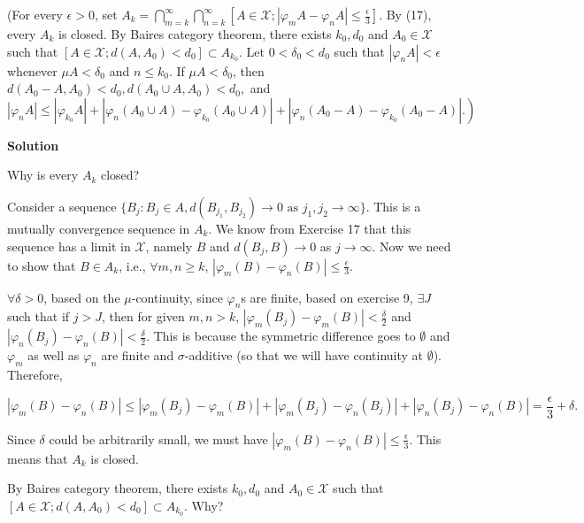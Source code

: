 \documentclass[
]{article}
\begin{document}
(For every \(\epsilon>0\), set
\(A_k=\bigcap_{m=k}^{\infty} \bigcap_{n=k}^{\infty}\left[A \in \mathcal X ;\left|\varphi_m A-\varphi_n A\right|\right.\left.\le \frac{\epsilon}{3}\right]\).
By (17), every \(A_k\) is closed. By Baire\textquotesingle s category
theorem, there exists \(k_0, d_0\) and \(A_0 \in \mathcal X\) such that
\(\left[A \in \mathcal X ; d\left(A, A_0\right)<d_0\right] \subset A_{k_0}\).
Let \(0<\delta_0<d_0\) such that \(\left|\varphi_n A\right|<\epsilon\)
whenever \(\mu A<\delta_0\) and \(n \le k_0\). If \(\mu A<\delta_0\),
then
\(d\left(A_0-A, A_0\right)<d_0,  d\left(A_0 \cup A, A_0\right)<d_0,\)
and
\(\left|\varphi_n A\right| \le\left|\varphi_{k_0} A\right|+\left.\left|\varphi_n\left(A_0 \cup A\right)-\varphi_{k_0}\left(A_0 \cup A\right)\right|+\left|\varphi_n\left(A_0-A\right)-\varphi_{k_0}\left(A_0-A\right)\right|.\right)\)

\textbf{Solution}

Why is every \(A_k\) closed?

Consider a sequence
\(\{B_{j}: B_j\in A, d(B_{j_1}, B_{j_2}) \to 0 \text{ as } j_1, j_2 \to \infty\}\).
This is a mutually convergence sequence in \(A_k\). We know from
Exercise 17 that this sequence has a limit in \(\mathcal X\), namely
\(B\) and \(d(B_j, B) \to 0\) as \(j \to \infty\). Now we need to show
that \(B\in A_k\), i.e., \(\forall m, n \ge k\),
\(|\varphi_m(B) - \varphi_n(B)| \le \frac{\epsilon}{3}\).

\(\forall \delta > 0\), based on the \(\mu\)-continuity, since
\(\varphi_n\)\textquotesingle s are finite, based on exercise 9,
\(\exists J\) such that if \(j > J\), then for given \(m, n > k\),
\(|\varphi_m(B_j) - \varphi_m(B)| < \frac{\delta}{2}\) and
\(|\varphi_n(B_j) - \varphi_n(B)|  < \frac{\delta}{2}\). This is because
the symmetric difference goes to \(\emptyset\) and \(\varphi_m\) as well
as \(\varphi_n\) are finite and \(\sigma\)-additive (so that we will
have continuity at \(\emptyset\)). Therefore,

\[|\varphi_m(B) - \varphi_n(B)| \le |\varphi_m(B_j) - \varphi_m(B)| + |\varphi_m(B_j) - \varphi_n(B_j)| + |\varphi_n(B_j) - \varphi_n(B)| = \frac{\epsilon}{3} + \delta.\]

Since \(\delta\) could be arbitrarily small, we must have
\(|\varphi_m(B) - \varphi_n(B)| \le \frac{\epsilon}{3}\). This means
that \(A_k\) is closed.

By Baire\textquotesingle s category theorem, there exists \(k_0, d_0\)
and \(A_0 \in \mathcal X\) such that
\(\left[A \in \mathcal X ; d\left(A, A_0\right)<d_0\right] \subset A_{k_0}\).
Why?
\end{document}
